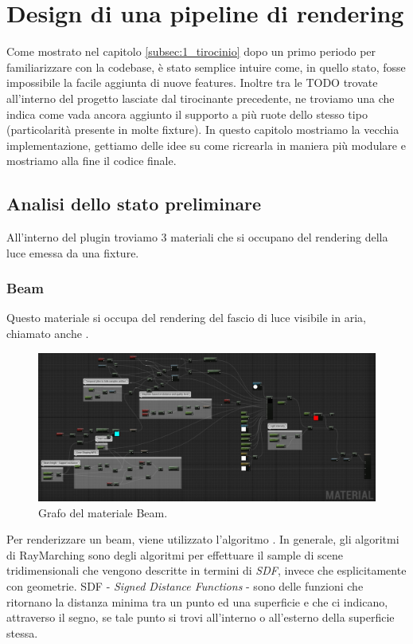 \documentclass[main.tex]{subfiles}
\begin{document}
\sloppy


\vspace{1.0cm}

\section{Design di una pipeline di rendering}\label{sec:RenderingPipeline}
Come mostrato nel capitolo \ref{subsec:1_tirocinio} dopo un primo periodo per familiarizzare con la codebase, è stato semplice intuire come, in quello stato, fosse impossibile la facile aggiunta di nuove features. Inoltre tra le TODO trovate all'interno del progetto lasciate dal tirocinante precedente, ne troviamo una che indica come vada ancora aggiunto il supporto a più ruote dello stesso tipo (particolarità presente in molte fixture). In questo capitolo mostriamo la vecchia implementazione, gettiamo delle idee su come ricrearla in maniera più modulare e mostriamo alla fine il codice finale.

\subsection{Analisi dello stato preliminare}\label{subsec:2_oldImplementation}
All'interno del plugin troviamo 3 materiali che si occupano del rendering della luce emessa da una fixture.
\subsubsection{Beam}\label{subsec:2_1_beam}
Questo materiale si occupa del rendering del fascio di luce visibile in aria, chiamato anche .
\begin{figure}[H]
    \centering
    \includegraphics[width=1\linewidth]{img/renderingPipeline/BeamMaterialFull.jpg}
    \caption{Grafo del materiale Beam.}
    \label{fig:2_beamGraphFull}
\end{figure}
\noindent Per renderizzare un beam, viene utilizzato l'algoritmo . In generale, gli algoritmi di RayMarching \cite{RayMarching} sono degli algoritmi per effettuare il sample di scene tridimensionali che vengono descritte in termini di \textit{SDF}, invece che esplicitamente con geometrie. SDF - \textit{Signed Distance Functions} - sono delle funzioni che ritornano la distanza minima tra un punto ed una superficie e che ci indicano, attraverso il segno, se tale punto si trovi all'interno o all'esterno della superficie stessa.\newline
\end{document}
